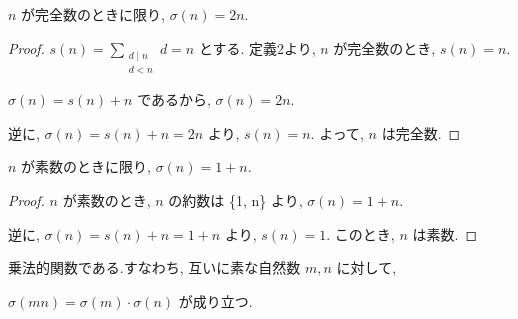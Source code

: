 \begin{lemma}\label{perfect_iff_sum_divisors_eq_two_mul}
\leanok{}

\(n\) が完全数のときに限り, \(\sigma(n) = 2n\).

\end{lemma}

\begin{proof}
\(s(n) = \sum_{\substack{d \mid n\\ d < n}} d = n\) とする.
定義2より, \(n\) が完全数のとき, \(s(n) = n\).

\(\sigma(n) = s(n) + n\) であるから, \(\sigma(n) = 2n\).

逆に, \(\sigma(n) = s(n) + n = 2n\) より, \(s(n) = n\).
よって, \(n\) は完全数.
\end{proof}

\begin{lemma}\label{prime_iff_sum_divisors_eq_succ}\leanok

\(n\) が素数のときに限り, \(\sigma(n) =  1 + n\).

\end{lemma}

\begin{proof}
\(n\) が素数のとき, \(n\) の約数は \{1, n\} より, \(\sigma(n) = 1 + n\).

逆に, \(\sigma(n) = s(n) + n = 1 + n\) より, \(s(n) = 1\).
このとき, \(n\) は素数.
\end{proof}

\begin{lemma}\label{isMultiplicative}\leanok
乗法的関数である.すなわち, 互いに素な自然数 \(m, n\) に対して,

\(\sigma(mn) = \sigma(m) \cdot \sigma(n)\) が成り立つ.

\end{lemma}

